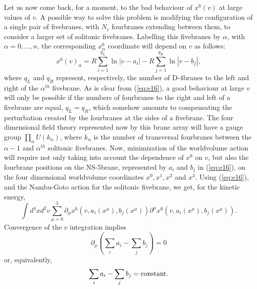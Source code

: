 Let us now come back, for a moment, to the bad behaviour of
$x^6(v)$ at large values of $v$. A possible way to solve this
problem is modifying the configuration of a single pair of
fivebranes, with $N_c$ fourbranes extending between them, to
consider a larger set of solitonic fivebranes. Labelling this
fivebranes by $\alpha$, with $\alpha=0,\ldots,n$, the corresponding $x^6_{\alpha}$
coordinate will depend on $v$ as follows:
\begin{equation}
x^6(v)_{\alpha} = R \sum_{i=1}^{q_L} \ln |v-a_i| - R \sum_{j=1}^{q_R} \ln |v-b_j|,
\label{eq:e16}
\end{equation}
where $q_L$ and $q_R$ represent, respectively, the number of
D-$4$branes to the left and right of the $\alpha^{th}$ fivebrane.
As is clear from (\ref{eq:e16}), a good behaviour at large $v$
will only be possible if the numbers of fourbranes to the right
and left of a fivebrane are equal, $q_L=q_R$, which somehow
amounts to compensating the perturbation created by the
fourbranes at the sides of a fivebrane. The four dimensional
field theory represented now by this brane array will have a
gauge group $\prod_{\alpha} U(k_{\alpha})$, where $k_{\alpha}$ is the number
of transversal fourbranes between the $\alpha-1$ and
$\alpha^{th}$ solitonic fivebranes. Now, minimization of the
worldvolume action will require not only taking into account the
dependence of $x^6$ on $v$, but also the fourbrane positions on
the NS-$5$brane, represented by $a_i$ and $b_j$ in
(\ref{eq:e16}), on the four dimensional worldvolume coordinates
$x^0,x^1,x^2$ and $x^3$. Using (\ref{eq:e16}), and the Nambu-Goto
action for the solitonic fivebrane, we get, for the kinetic
energy,
\begin{equation}
\int d^4 x d^2 v \sum_{\mu = 0} ^{3} \partial_{\mu} x^6
(v,a_i(x^{\mu}),b_j(x^{\mu})) \partial^{\mu} x^6
(v,a_i(x^{\mu}),b_j(x^{\mu})).
\label{eq:e17}
\end{equation}
Convergence of the $v$ integration implies
\begin{equation}
\partial_{\mu}(\sum_i a_i -\sum_j b_j)=0
\label{eq:e18}
\end{equation}
or, equivalently,
\begin{equation}
\sum_i a_i - \sum_j b_j = \hbox{constant}.
\label{eq:e19}
\end{equation}
  

